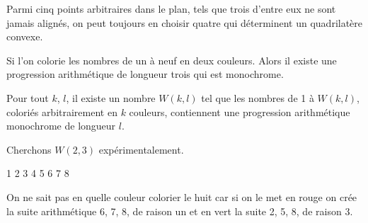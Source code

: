 \begin{mytheo} 
Parmi cinq points arbitraires dans le plan, tels que trois d'entre eux ne sont  jamais alignés, on peut toujours en choisir quatre qui déterminent un quadrilatère convexe.
\end{mytheo}

\begin{mytheo}
Si l'on colorie les nombres de un à neuf en deux couleurs.  Alors il existe une progression arithmétique de longueur trois qui est monochrome.
\end{mytheo}

\begin{mytheo} 
Pour tout $k$, $l$, il existe un nombre $W(k,l)$ tel que les nombres de 1 à $W(k,l)$, coloriés arbitrairement en $k$ couleurs, contiennent une progression arithmétique monochrome de longueur $l$.
\end{mytheo}

\begin{myexem} Cherchons $W(2,3)$ expérimentalement.

\color{green}1 \color{green}2 \color{red}3 \color{green}4 \color{green}5  \color{red}6 \color{red}7 \color{black}8

On ne sait pas en quelle couleur colorier le huit car si on le met en rouge on crée la suite arithmétique 6, 7, 8, de raison un et en vert la suite 2, 5, 8, de raison 3.
\end{myexem}
